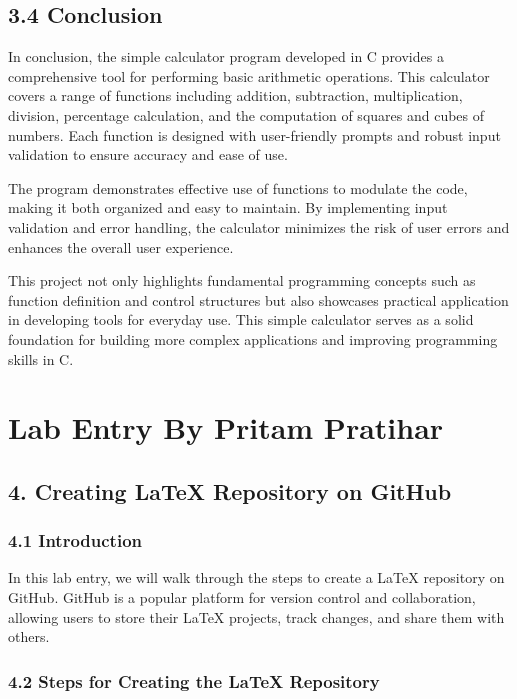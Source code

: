 \documentclass[a4paper,12pt]{article}
\begin{document}
\subsection*{3.4 Conclusion}
In conclusion, the simple calculator program developed in C provides a comprehensive tool for performing basic arithmetic operations. This calculator covers a range of functions including addition, subtraction, multiplication, division, percentage calculation, and the computation of squares and cubes of numbers. Each function is designed with user-friendly prompts and robust input validation to ensure accuracy and ease of use.

The program demonstrates effective use of functions to modulate the code, making it both organized and easy to maintain. By implementing input validation and error handling, the calculator minimizes the risk of user errors and enhances the overall user experience.

This project not only highlights fundamental programming concepts such as function definition and control structures but also showcases practical application in developing tools for everyday use. This simple calculator serves as a solid foundation for building more complex applications and improving programming skills in C.

\newpage
\section*{Lab Entry By Pritam Pratihar}
\subsection*{4. Creating LaTeX Repository on GitHub}

\subsubsection*{4.1 Introduction}
In this lab entry, we will walk through the steps to create a LaTeX repository on GitHub. GitHub is a popular platform for version control and collaboration, allowing users to store their LaTeX projects, track changes, and share them with others.

\subsubsection*{4.2 Steps for Creating the LaTeX Repository}
\end{document}
